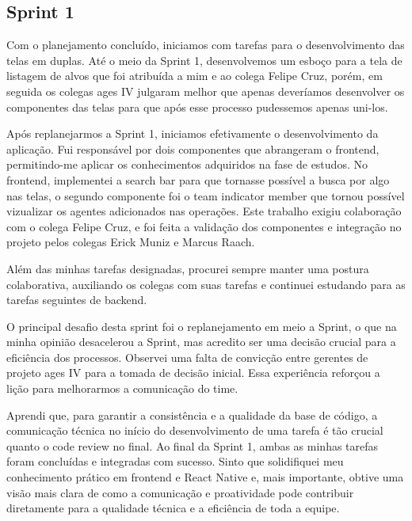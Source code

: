 \subsection{Sprint 1}

Com o planejamento concluído, iniciamos com tarefas para o desenvolvimento das telas em duplas. Até o meio da Sprint 1, desenvolvemos um esboço para a tela de listagem de alvos que foi atribuída a mim e ao colega Felipe Cruz, porém, em seguida os colegas \ac{ages} IV julgaram melhor que apenas deveríamos desenvolver os componentes das telas para que após esse processo pudessemos apenas uni-los. 

Após replanejarmos a Sprint 1, iniciamos efetivamente o desenvolvimento da aplicação. Fui responsável por dois componentes que abrangeram o frontend, permitindo-me aplicar os conhecimentos adquiridos na fase de estudos. No frontend, implementei a search bar para que tornasse possível a busca por algo nas telas, o segundo componente foi o team indicator member que tornou possível vizualizar os agentes adicionados nas operações. Este trabalho exigiu colaboração com o colega Felipe Cruz, e foi feita a validação dos componentes e integração no projeto pelos colegas Erick Muniz e Marcus Raach.

Além das minhas tarefas designadas, procurei sempre manter uma postura colaborativa, auxiliando os colegas com suas tarefas e continuei estudando para as tarefas seguintes de backend. 

O principal desafio desta sprint foi o replanejamento em meio a Sprint, o que na minha opinião desacelerou a Sprint, mas acredito ser uma decisão crucial para a eficiência dos processos. Observei uma falta de convicção entre gerentes de projeto \ac{ages} IV para a tomada de decisão inicial. Essa experiência reforçou a lição para melhorarmos a comunicação do time.

Aprendi que, para garantir a consistência e a qualidade da base de código, a comunicação técnica no início do desenvolvimento de uma tarefa é tão crucial quanto o code review no final. Ao final da Sprint 1, ambas as minhas tarefas foram concluídas e integradas com sucesso. Sinto que solidifiquei meu conhecimento prático em frontend e React Native e, mais importante, obtive uma visão mais clara de como a comunicação e proatividade pode contribuir diretamente para a qualidade técnica e a eficiência de toda a equipe.